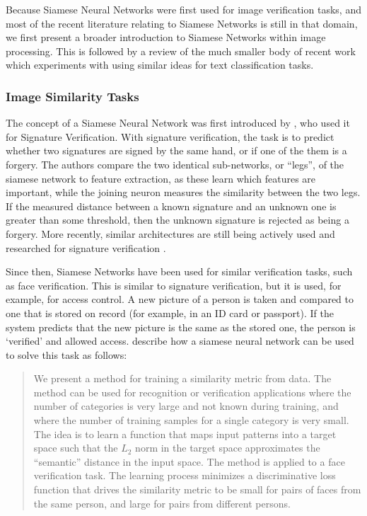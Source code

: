 Because Siamese Neural Networks were first used for image verification tasks, and most of the recent literature relating to Siamese Networks is still in that domain, we first present a broader introduction to Siamese Networks within image processing. This is followed by a review of the much smaller body of recent work which experiments with using similar ideas for text classification tasks.

\subsubsection{Image Similarity Tasks}
The concept of a Siamese Neural Network was first introduced by \citet{bromley1993signature}, who used it for Signature Verification. With signature verification, the task is to predict whether two signatures are signed by the same hand, or if one of the them is a forgery.  The authors compare the two identical sub-networks, or ``legs'', of the siamese network to feature extraction, as these learn which features are important, while the joining neuron measures the similarity between the two legs. If the measured distance between a known signature and an unknown one is greater than some threshold, then the unknown signature is rejected as being a forgery. More recently, similar architectures are still being actively used and researched for signature verification \cite{tiflin2012lstm}.

Since then, Siamese Networks have been used for similar verification tasks, such as face verification. This is similar to signature verification, but it is used, for example, for access control. A new picture of a person is taken and compared to one that is stored on record (for example, in an ID card or passport). If the system predicts that the new picture is the same as the stored one, the person is `verified' and allowed access. \citet{chopra2005learning} describe how a siamese neural network can be used to solve this task as follows:

\begin{quote}
We present a method for training a similarity metric from data. The method can be used for recognition or verification applications where the number of categories is very large and not known during training, and where the number of training samples for a single category is very small. The idea is to learn a function that maps input patterns into a target space such that the $L_2$ norm in the target space approximates the “semantic” distance in the input space. The method is applied to a face verification task. The learning process minimizes a discriminative loss function that drives the similarity metric to be small for pairs of faces from the same person, and large for pairs from different persons.
\end{quote}

